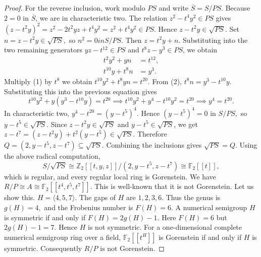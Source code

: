\documentclass[10pt,a4paper]{amsart}
\theoremstyle{definition}
\theoremstyle{remark}
\begin{document}
\begin{proof}
For the reverse inclusion, work modulo \(PS\) and write
\(
\overline{S}=S/PS.
\)
Because \(2=0\) in \(\overline S\), we are in characteristic two.
The relation
\(
z^2-t^4y^2\in PS
\)
gives
\(
(z-t^2y)^2
=
z^2-2t^2yz+t^4y^2
=
z^2+t^4y^2
\in PS.
\)
Hence
\(
z-t^2y\in\sqrt{PS}.
\)
Set
$
n=z-t^2y\in\sqrt{PS},$
so 
$n^2=0 { in } S/PS.$
Then \(z=t^2y+n\). Substituting into the two remaining generators
\(yz-t^{12}\in PS\) and \(t^8z-y^3\in PS\), we obtain
\begin{align}
t^2y^2+yn &= t^{12}, \tag{1}\\
t^{10}y+t^8n &= y^3. \tag{2}
\end{align}
Multiply (1) by \(t^8\) we obtain
\(
t^{10}y^2+t^8yn=t^{20}.
\)
From (2),
\(
t^8n=y^3-t^{10}y.
\)
Substituting this into the previous equation gives
\[
t^{10}y^2+y(y^3-t^{10}y)=t^{20}
\implies
t^{10}y^2+y^4-t^{10}y^2=t^{20}
\implies
y^4=t^{20}.
\]
In characteristic two,
\(
y^4-t^{20}=(y-t^5)^4.
\)
Hence
\(
(y-t^5)^4=0
 \text{ in }S/PS,
\)
so
\(
y-t^5\in\sqrt{PS}.
\)
Since \(z-t^2y\in\sqrt{PS}\) and \(y-t^5\in\sqrt{PS}\), we get
\(
z-t^7
=
(z-t^2y)+t^2(y-t^5)
\in\sqrt{PS}.
\)
Therefore
\(
Q=(2,y-t^5,z-t^7)\subseteq\sqrt{PS}.
\)
Combining the inclusions gives
\({\sqrt{PS}=Q.}
\)
Using the above radical computation,
\[
S/\sqrt{PS}
\cong
\mathbb Z_2[[t,y,z]]/(2,y-t^5,z-t^7)
\cong
\mathbb F_2[[t]],
\]
which is regular, and every regular local ring is Gorenstein.
 We have
 \(
 R/P\cong A\cong\mathbb F_2[[t^4,t^5,t^7]].
 \)
 This is well-known that it is not Gorenstein.
 Let us show this.
 \(
 H=\langle4,5,7\rangle.
 \)
 The gaps of $H$ are
 \(
 1,2,3,6.
 \)
 Thus the genus is
 \(
 g(H)=4,
 \)
 and the Frobenius number is
 \(
 F(H)=6.
 \)
 A numerical semigroup $H$ is symmetric if and only if
 \(
 F(H)=2g(H)-1.
 \)
 Here
 \(
 F(H)=6 \)
 {but}
 \( 2g(H)-1=7.
 \)
 Hence $H$ is not symmetric.
 For a one-dimensional complete numerical semigroup ring over a field,
 \(
 \mathbb F_2[[t^H]]
 \)
 is Gorenstein if and only if $H$ is symmetric. 
 Consequently
 \(
 {R/P\text{ is not Gorenstein}.}
 \)
 \end{proof}
\end{document}
